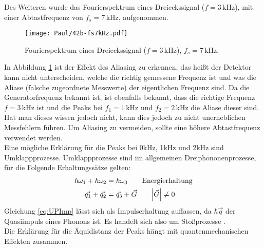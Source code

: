 \newpage
Des Weiteren wurde das Fourierspektrum eines Dreieckssignal ($f = 3$\,kHz), mit einer Abtastfrequenz von $f_s = 7$\,kHz, aufgenommen.
\begin{figure}[h]
    \centering
    \texttt{[image: Paul/42b-fs7kHz.pdf]}
    \caption{Fourierspektrum eines Dreieckssignal ($f = 3$\,kHz), $f_s = 7$\,kHz.}
    \label{fig:42a3}
\end{figure}

In Abbildung \ref{fig:42a3} ist der Effekt des Aliasing zu erkennen, das heißt der Detektor kann nicht unterscheiden, welche die richtig gemessene Frequenz ist und was die Aliase (falsche zugeordnete Messwerte) der eigentlichen Frequenz sind. Da die Generatorfrequenz bekannt ist, ist ebenfalls bekannt, dass die richtige Frequenz $f=3$\,kHz ist und die Peaks bei $f_1=1$\,kHz und $f_2=2$\,kHz die Aliase dieser sind. Hat man dieses wissen jedoch nicht, kann dies jedoch zu nicht unerheblichen Messfehlern führen. Um Aliasing zu vermeiden, sollte eine höhere Abtastfrequenz verwendet werden.\\

Eine mögliche Erklärung für die Peaks bei 0kHz, 1kHz und 2kHz sind Umklappprozesse.
Umklappprozesse sind im allgemeinen Dreiphononenprozesse, für die Folgende Erhaltungssätze gelten:
\begin{align}
    \hbar \omega_1 +\hbar \omega_2 &= \hbar \omega_3  \qquad \text{Energierhaltung}\\
    \vec{q_1} + \vec{q_2} &= \vec{q_3} + \vec{G} \qquad \abs{\vec{G}} \neq 0 \label{eq:UPImp}
\end{align}
Gleichung \ref{eq:UPImp} lässt sich als Impulserhaltung auffassen, da \( \hbar \vec{q}\) der Quasiimpuls eines Phonons ist. Es handelt sich also um Stoßprozesse \citep{EFP}.\\
Die Erklärung für die Äquidistanz der Peaks hängt mit quantenmechanischen Effekten zusammen.